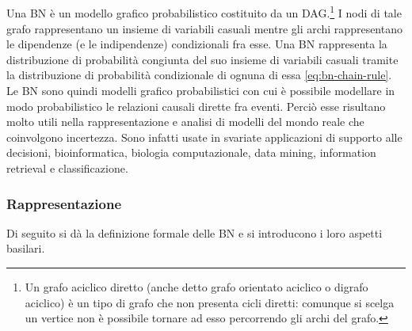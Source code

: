 \subsection{\bn{}}
\label{sec:bn}
Una \acl{BN} è un modello grafico probabilistico costituito da un \acf{DAG}.\footnote{Un grafo aciclico diretto (anche detto grafo orientato aciclico o digrafo aciclico) è un tipo di grafo che non presenta cicli diretti: comunque si scelga un vertice non è possibile tornare ad esso percorrendo gli archi del grafo.} I nodi di tale grafo rappresentano un insieme di variabili casuali mentre gli archi rappresentano le dipendenze (e le indipendenze) condizionali fra esse. 
Una \acs{BN} rappresenta la distribuzione di probabilità congiunta del suo insieme di variabili casuali tramite la distribuzione di probabilità condizionale di ognuna di essa \eqref{eq:bn-chain-rule}.
Le \acs{BN} sono quindi modelli grafico probabilistici con cui è possibile modellare in modo probabilistico le relazioni causali dirette fra eventi. Perciò esse risultano molto utili nella rappresentazione e analisi di modelli del mondo reale che coinvolgono incertezza. Sono infatti usate in svariate applicazioni di supporto alle decisioni, bioinformatica, biologia computazionale, data mining, information retrieval e classificazione.

\subsubsection{Rappresentazione}
Di seguito si dà la definizione formale delle \acl{BN} e si introducono i loro aspetti basilari.

